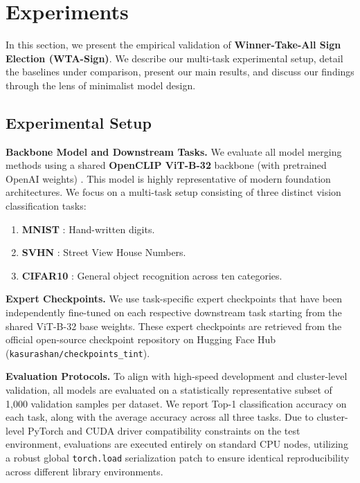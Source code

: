 \section{Experiments}
\label{submission:experiments}

In this section, we present the empirical validation of \textbf{\mbox{Winner-Take-All} Sign Election (WTA-Sign)}.
We describe our multi-task experimental setup, detail the baselines under comparison, present our main results, and discuss our findings through the lens of minimalist model design.

\subsection{Experimental Setup}

\textbf{Backbone Model and Downstream Tasks.}
We evaluate all model merging methods using a shared \textbf{OpenCLIP ViT-B-32} backbone (with pretrained OpenAI weights) \cite{radford2021learning}.
This model is highly representative of modern foundation architectures.
We focus on a multi-task setup consisting of three distinct vision classification tasks:
\begin{enumerate}
    \item \textbf{MNIST} \cite{lecun1998gradient}: Hand-written digits.
    \item \textbf{SVHN} \cite{netzer2011reading}: Street View House Numbers.
    \item \textbf{CIFAR10} \cite{krizhevsky2009learning}: General object recognition across ten categories.
\end{enumerate}

\textbf{Expert Checkpoints.}
We use task-specific expert checkpoints that have been independently fine-tuned on each respective downstream task starting from the shared ViT-B-32 base weights.
These expert checkpoints are retrieved from the official open-source checkpoint repository on Hugging Face Hub (\texttt{kasurashan/checkpoints\_tint}).

\textbf{Evaluation Protocols.}
To align with high-speed development and cluster-level validation, all models are evaluated on a statistically representative subset of 1,000 validation samples per dataset.
We report Top-1 classification accuracy on each task, along with the average accuracy across all three tasks.
Due to cluster-level PyTorch and CUDA driver compatibility constraints on the test environment, evaluations are executed entirely on standard CPU nodes, utilizing a robust global \texttt{torch.load} serialization patch to ensure identical reproducibility across different library environments.

